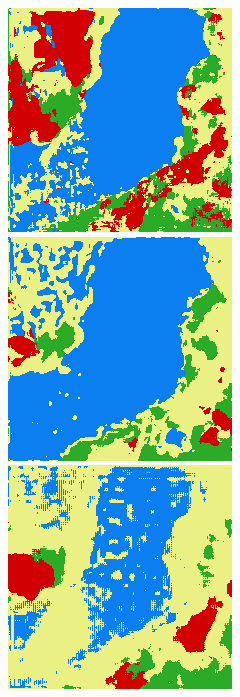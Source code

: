 \begin{figure}
    \includegraphics[width=\DensenetPredictionsImageWidth]{images/densenet/densenet-103/101444-prediction} \hfill
    \includegraphics[width=\DensenetPredictionsImageWidth]{images/densenet/densenet-67D/101444-prediction}
    \includegraphics[width=\DensenetPredictionsImageWidth]{images/densenet/densenet-56D/101444-prediction}


\end{figure}
